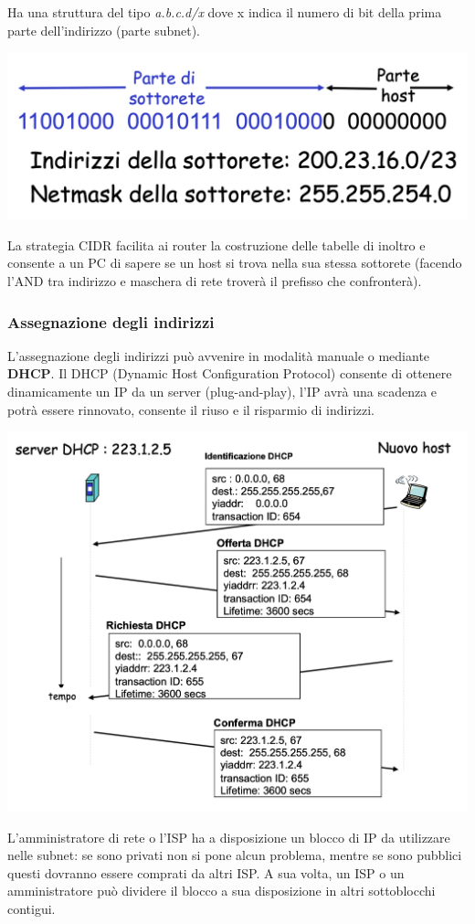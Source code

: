 \documentclass{report}
\begin{document}
Ha una struttura del tipo \emph{a.b.c.d/x} dove x indica il numero di
bit della prima parte dell'indirizzo (parte subnet).

\begin{center}
		\includegraphics[width=0.5\linewidth]{cidr}
	\end{center}

La strategia CIDR facilita ai router la costruzione delle tabelle di
inoltro e consente a un PC di sapere se un host si trova nella sua
stessa sottorete (facendo l'AND tra indirizzo e maschera di rete troverà
il prefisso che confronterà).

\hypertarget{header-n110}{%
\subsubsection{Assegnazione degli indirizzi}\label{header-n110}}

L'assegnazione degli indirizzi può avvenire in modalità manuale o
mediante \textbf{DHCP}. Il DHCP (Dynamic Host Configuration Protocol)
consente di ottenere dinamicamente un IP da un server (plug-and-play),
l'IP avrà una scadenza e potrà essere rinnovato, consente il riuso e il
risparmio di indirizzi.

\begin{center}
		\includegraphics[width=0.7\linewidth]{dhcp}
	\end{center}

L'amministratore di rete o l'ISP ha a disposizione un blocco di IP da
utilizzare nelle subnet: se sono privati non si pone alcun problema,
mentre se sono pubblici questi dovranno essere comprati da altri ISP. A
sua volta, un ISP o un amministratore può dividere il blocco a sua
disposizione in altri sottoblocchi contigui.
\end{document}
